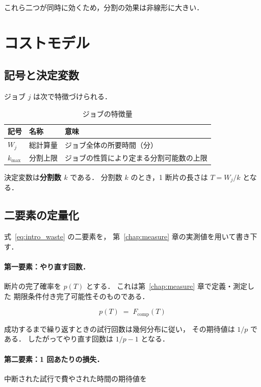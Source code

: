 \documentclass[11pt,a4paper]{ltjsreport}
\newcommand{\Fcomp}{F_{\mathrm{comp}}}
\begin{document}
これら二つが同時に効くため，分割の効果は非線形に大きい．

\section{コストモデル}
\label{sec:model}

\subsection{記号と決定変数}

ジョブ $j$ は次で特徴づけられる．

\begin{table}[htbp]
\centering
\caption{ジョブの特徴量}
\label{tab:job}
\small
\begin{tabularx}{\textwidth}{@{}llX@{}}
\toprule
記号 & 名称 & 意味 \\
\midrule
$W_j$      & 総計算量 & ジョブ全体の所要時間（分） \\
$k_{\max}$ & 分割上限 & ジョブの性質により定まる分割可能数の上限 \\
\bottomrule
\end{tabularx}
\end{table}

決定変数は\textbf{分割数 $k$} である．
分割数 $k$ のとき，1 断片の長さは $T = W_j / k$ となる．

\subsection{二要素の定量化}

式~\eqref{eq:intro_waste} の二要素を，
第~\ref{chap:measure} 章の実測値を用いて書き下す．

\paragraph{第一要素：やり直す回数．}
断片の完了確率を $p(T)$ とする．
これは第~\ref{chap:measure} 章で定義・測定した
期限条件付き完了可能性そのものである．

\begin{equation}
p(T) \;=\; \Fcomp(T)
\label{eq:p_is_fcomp}
\end{equation}

成功するまで繰り返すときの試行回数は幾何分布に従い，
その期待値は $1/p$ である．
したがってやり直す回数は $1/p - 1$ となる．

\paragraph{第二要素：1 回あたりの損失．}
中断された試行で費やされた時間の期待値を
\end{document}
